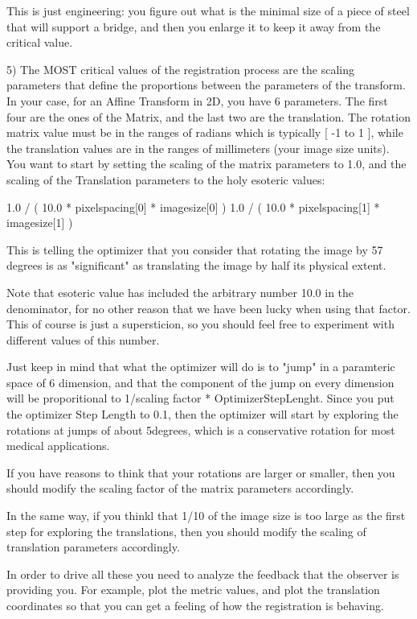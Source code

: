 This is just engineering: you figure out what is the minimal
size of a piece of steel that will support a bridge, and then
you enlarge it to keep it away from the critical value.

5)  The MOST critical values of the registration process are the
scaling parameters that define the proportions between
the parameters of the transform. In your case, for an Affine
Transform in 2D, you have 6 parameters. The first four are
the ones of the Matrix, and the last two are the translation.
The rotation matrix value must be in the ranges of radians
which is typically [ -1 to 1 ], while the translation values are
in the ranges of millimeters (your image size units).
You want to start by setting the scaling of the matrix
parameters to 1.0, and the scaling of the Translation
parameters to the holy esoteric values:

1.0   /  (  10.0 * pixelspacing[0]  *  imagesize[0]  )
1.0   /  (  10.0 * pixelspacing[1]  *  imagesize[1]  )

This is telling the optimizer that you consider that rotating
the image by 57 degrees is as "significant" as translating
the image by half its physical extent.

Note that esoteric value has included the arbitrary number
10.0 in the denominator, for no other reason that we have
been lucky when using that factor. This of course is just a
supersticion, so you should feel free to experiment with
different values of this number.

Just keep in mind that what the optimizer will do is to
"jump" in a paramteric space of 6 dimension, and that the
component of the jump on every dimension will be proporitional
to 1/scaling factor * OptimizerStepLenght.     Since you put
the optimizer Step Length to 0.1, then the optimizer will start
by exploring the rotations at jumps of about 5degrees, which
is a conservative rotation for most medical applications.

If you have reasons to think that your rotations are larger or
smaller, then you should modify the scaling factor of the  matrix
parameters accordingly.

In the same way, if you thinkl that 1/10 of the image size is too
large as the first step for exploring the translations, then you
should modify the scaling of  translation parameters accordingly.



In order to drive all these you need to analyze the feedback that
the observer is providing you. For example, plot the metric values,
and plot the translation coordinates so that you can get a feeling
of how the registration is behaving.


